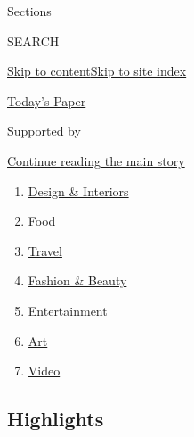 Sections

SEARCH

\protect\hyperlink{site-content}{Skip to
content}\protect\hyperlink{site-index}{Skip to site index}

\href{https://myaccount.nytimes.com/auth/login?response_type=cookie\&client_id=vi}{}

\href{https://www.nytimes.com/section/todayspaper}{Today's Paper}

Supported by

\protect\hyperlink{after-sponsor}{Continue reading the main story}

\begin{enumerate}
\def\labelenumi{\arabic{enumi}.}
\tightlist
\item
  \href{/section/t-magazine/design}{Design \& Interiors}
\item
  \href{/section/t-magazine/food}{Food}
\item
  \href{/section/t-magazine/travel}{Travel}
\item
  \href{/section/t-magazine/fashion}{Fashion \& Beauty}
\item
  \href{/section/t-magazine/entertainment}{Entertainment}
\item
  \href{/section/t-magazine/art}{Art}
\item
  \href{/video/t-magazine}{Video}
\end{enumerate}

\hypertarget{highlights}{%
\subsection{Highlights}\label{highlights}}

